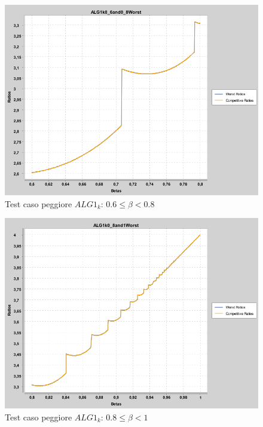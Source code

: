 \documentclass[twoside,openany,titlepage,fleqn,
	headinclude,12pt,a4paper,BCOR5mm,footinclude]{scrbook}
\begin{document}
\begin{figure}[H]
\caption{Test caso peggiore $ALG1_{k}$: $0.6 \leq \beta < 0.8$}
\centering
\includegraphics[scale=0.4]{worst/ALG1k0_6and0_8Worst.png}
\end{figure}
\begin{figure}[H]
\caption{Test caso peggiore $ALG1_{k}$: $0.8 \leq \beta < 1$}
\centering
\includegraphics[scale=0.4]{worst/ALG1k0_8and1Worst.png}
\end{figure}
\end{document}
